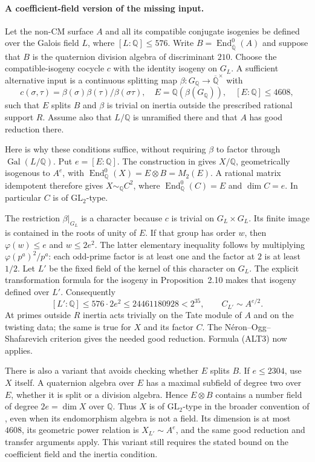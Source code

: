 \paragraph{A coefficient-field version of the missing input.}
Let the non-CM surface $A$ and all its compatible conjugate isogenies
be defined over the Galois field $L$, where $[L:\mathbb Q]\leq576$.
Write $B=\operatorname{End}_{\overline{\mathbb Q}}^0(A)$ and suppose
that $B$ is the quaternion division algebra of discriminant $210$.
Choose the compatible-isogeny cocycle $c$ with the identity isogeny
on $G_L$. A sufficient alternative input is a continuous splitting
map $\beta:G_{\mathbb Q}\to\overline{\mathbb Q}^{\times}$ with
\[
 c(\sigma,\tau)=\beta(\sigma)\beta(\tau)/\beta(\sigma\tau),
 \quad E=\mathbb Q(\beta(G_{\mathbb Q})),\quad [E:\mathbb Q]\leq4608,
\]
such that $E$ splits $B$ and $\beta$ is trivial on inertia outside
the prescribed rational support $R$. Assume also that $L/\mathbb Q$
is unramified there and that $A$ has good reduction there.

Here is why these conditions suffice, without requiring $\beta$ to
factor through $\operatorname{Gal}(L/\mathbb Q)$.
Put $e=[E:\mathbb Q]$. The construction in
\cite[Propositions~2.10--2.11 and Corollary~2.12]{guitart2012}
gives $X/\mathbb Q$, geometrically isogenous to $A^e$, with
$\operatorname{End}_{\mathbb Q}^0(X)=E\otimes B=M_2(E)$.
A rational matrix idempotent therefore gives $X\sim_{\mathbb Q}C^2$,
where $\operatorname{End}_{\mathbb Q}^0(C)=E$ and $\dim C=e$.
In particular $C$ is of $\mathrm{GL}_2$-type.

The restriction $\beta|_{G_L}$ is a character because $c$ is trivial
on $G_L\times G_L$. Its finite image is contained in the roots of
unity of $E$. If that group has order $w$, then $\varphi(w)\leq e$
and $w\leq2e^2$. The latter elementary inequality follows by
multiplying $\varphi(p^a)^2/p^a$: each odd-prime factor is at least
one and the factor at $2$ is at least $1/2$.
Let $L'$ be the fixed field of the kernel of this character on $G_L$.
The explicit transformation formula for the isogeny in
Proposition~2.10 makes that isogeny defined over $L'$. Consequently
\[
 [L':\mathbb Q]\leq576\cdot2e^2
 \leq24461180928<2^{35},\qquad C_{L'}\sim A^{e/2}.
\]
At primes outside $R$ inertia acts trivially on the Tate module of
$A$ and on the twisting data; the same is true for $X$ and its
factor $C$. The N\'eron--Ogg--Shafarevich criterion gives the needed
good reduction. Formula (ALT3) now applies.

There is also a variant that avoids checking whether $E$ splits $B$.
If $e\leq2304$, use $X$ itself. A quaternion algebra over $E$ has a
maximal subfield of degree two over $E$, whether it is split or a
division algebra. Hence $E\otimes B$ contains a number field of
degree $2e=\dim X$ over $\mathbb Q$. Thus $X$ is of
$\mathrm{GL}_2$-type in the broader convention of
\cite{vonKaenel2021}, even when its endomorphism algebra is not a
field. Its dimension is at most $4608$, its geometric power relation
is $X_{L'}\sim A^e$, and the same good reduction and transfer
arguments apply. This variant still requires the stated bound on
the coefficient field and the inertia condition.

